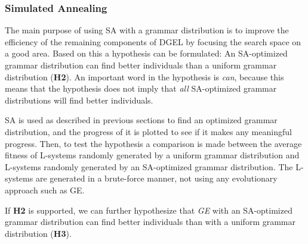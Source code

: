 \subsubsection{Simulated Annealing}
The main purpose of using \gls{SA} with a grammar distribution is to improve the efficiency of the remaining components of \gls{DGEL} by focusing the search space on a good area.
Based on this a hypothesis can be formulated: An \gls{SA}-optimized grammar distribution can find better individuals than a uniform grammar distribution (\textbf{H2}).
An important word in the hypothesis is \textit{can}, because this means that the hypothesis does not imply that \textit{all} \gls{SA}-optimized grammar distributions will find better individuals.

\gls{SA} is used as described in previous sections to find an optimized grammar distribution, and the progress of it is plotted to see if it makes any meaningful progress.
Then, to test the hypothesis a comparison is made between the average fitness of \glspl{L-system} randomly generated by a uniform grammar distribution and \glspl{L-system} randomly generated by an \gls{SA}-optimized grammar distribution.
The \glspl{L-system} are generated in a brute-force manner, not using any evolutionary approach such as \gls{GE}.

If \textbf{H2} is supported, we can further hypothesize that \textit{\gls{GE}} with an \gls{SA}-optimized grammar distribution can find better individuals than with a uniform grammar distribution (\textbf{H3}).

